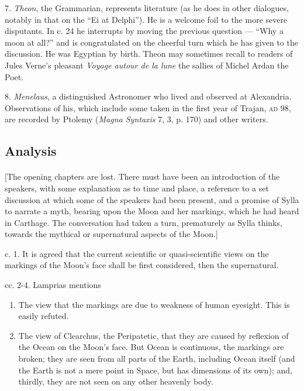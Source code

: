 \documentclass[a4paper, 11pt, oneside, polutonikogreek, english]{article}
\begin{document}
7. \emph{Theon}, the Grammarian, represents literature (as he does in other dialogues, notably in that on the ``Ei at Delphi''). He is a welcome foil to the more severe disputants. In c. 24 he interrupts by moving the previous question --- ``Why a moon at all?'' and is congratulated on the cheerful turn which he has given to the discussion. He was Egyptian by birth. Theon may sometimes recall to readers of Jules Verne's pleasant \emph{Voyage autour de la lune} the sallies of Michel Ardan the Poet.

8. \emph{Menelaus}, a distinguished Astronomer who lived and observed at Alexandria. Observations of his, which include some taken in the first year of Trajan, \textsc{ad} 98, are recorded by Ptolemy (\emph{Magna Syntaxis} 7, 3, p. 170) and other writers.

\subsection*{Analysis}
\paragraph{}
[The opening chapters are lost. There must have been an introduction of the speakers, with some explanation as to time and place, a reference to a set discussion at which some of the speakers had been present, and a promise of Sylla to narrate a myth, bearing upon the Moon and her markings, which he had heard in Carthage. The conversation had taken a turn, prematurely as Sylla thinks, towards the mythical or supernatural aspects of the Moon.]

c. 1. It is agreed that the current scientific or quasi-scientific views on the markings of the Moon's face shall be first considered, then the supernatural.

cc. 2-4. Lamprias mentions
\begin{enumerate}
    \item The view that the markings are due to weakness of human eyesight. This is easily refuted.

    \item The view of Clearchus, the Peripatetic, that they are caused by reflexion of the Ocean on the Moon's face. But Ocean is continuous, the markings are broken; they are seen from all parts of the Earth, including Ocean itself (and the Earth is not a mere point in Space, but has dimensions of its own); and, thirdly, they are not seen on any other heavenly body.
\end{enumerate}
\end{document}
